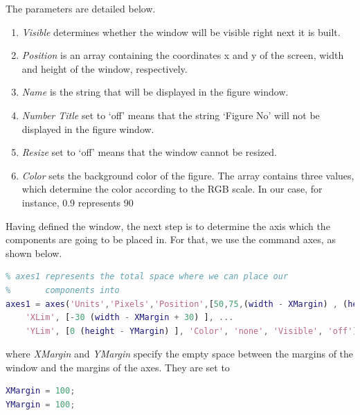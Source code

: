 \vspace{10pt}
 
The parameters are detailed below.

\begin{enumerate}    
	\item \textit{Visible} determines whether the window will be visible right next
	it is built.
	\item \textit{Position} is an array containing the coordinates x and y of the
	screen, width and height of the window, respectively.
	\item \textit{Name} is the string that will be displayed in the figure window.
	\item \textit{Number Title} set to ‘off’ means that the string ‘Figure No’ will
	not be displayed in the figure window.
	\item \textit{Resize} set to ‘off’ means that the window cannot be resized.
	\item \textit{Color} sets the background color of the figure.  The array
	contains three values, which determine the color according to the RGB scale. In our case, for instance, 0.9 represents 90%
\end{enumerate}

Having defined the window, the next step is to determine the axis which the
components are going to be placed in.  For that, we use the command axes, as
shown below.

\vspace{10pt}

\begin{lstlisting}[language=Matlab]
% Board's characteristics
% axes1 represents the total space where we can place our
%       components into
axes1 = axes('Units','Pixels','Position',[50,75,(width - XMargin) , (height - YMargin) ],
    'XLim', [-30 (width - XMargin + 30) ], ...
    'YLim', [0 (height - YMargin) ], 'Color', 'none', 'Visible', 'off');
\end{lstlisting}

\vspace{10pt}

where \textit{XMargin} and \textit{YMargin} specify the empty space between the
margins of the window and the margins of the axes.  They are set to

\vspace{10pt}

\begin{lstlisting}[language=Matlab]
XMargin = 100;
YMargin = 100;
\end{lstlisting}

